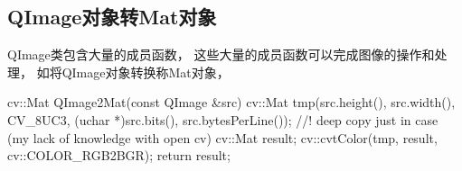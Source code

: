 \subsection{QImage对象转Mat对象}
QImage类包含大量的成员函数，%
这些大量的成员函数可以完成图像的操作和处理，%
如将QImage对象转换称Mat对象，
\begin{cppcode}
  cv::Mat QImage2Mat(const QImage &src)
  {
    cv::Mat tmp(src.height(), src.width(), CV_8UC3, (uchar *)src.bits(), src.bytesPerLine());
    //! deep copy just in case (my lack of knowledge with open cv)
    cv::Mat result;
    cv::cvtColor(tmp, result, cv::COLOR_RGB2BGR);
    return result;
  }
\end{cppcode}


